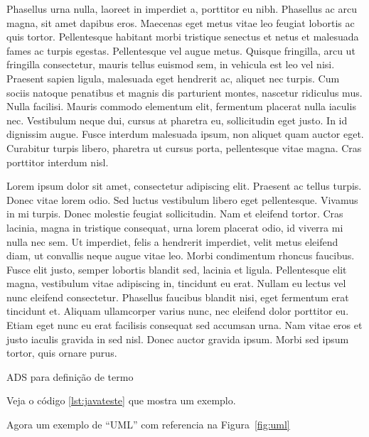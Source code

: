 \documentclass[tec, ads, scr, classic, a4paper,twoside]{ifbatcc}
\begin{document}
Phasellus urna nulla, laoreet in imperdiet a, porttitor eu nibh. Phasellus ac arcu magna, sit amet dapibus eros. Maecenas eget metus vitae leo feugiat lobortis ac quis tortor. Pellentesque habitant morbi tristique senectus et netus et malesuada fames ac turpis egestas. Pellentesque vel augue metus. Quisque fringilla, arcu ut fringilla consectetur, mauris tellus euismod sem, in vehicula est leo vel nisi. Praesent sapien ligula, malesuada eget hendrerit ac, aliquet nec turpis. Cum sociis natoque penatibus et magnis dis parturient montes, nascetur ridiculus mus. Nulla facilisi. Mauris commodo elementum elit, fermentum placerat nulla iaculis nec. Vestibulum neque dui, cursus at pharetra eu, sollicitudin eget justo. In id dignissim augue. Fusce interdum malesuada ipsum, non aliquet quam auctor eget. Curabitur turpis libero, pharetra ut cursus porta, pellentesque vitae magna. Cras porttitor interdum nisl.

Lorem ipsum dolor sit amet, consectetur adipiscing elit. Praesent ac tellus turpis. Donec vitae lorem odio. Sed luctus vestibulum libero eget pellentesque. Vivamus in mi turpis. Donec molestie feugiat sollicitudin. Nam et eleifend tortor. Cras lacinia, magna in tristique consequat, urna lorem placerat odio, id viverra mi nulla nec sem. Ut imperdiet, felis a hendrerit imperdiet, velit metus eleifend diam, ut convallis neque augue vitae leo. Morbi condimentum rhoncus faucibus. Fusce elit justo, semper lobortis blandit sed, lacinia et ligula. Pellentesque elit magna, vestibulum vitae adipiscing in, tincidunt eu erat. Nullam eu lectus vel nunc eleifend consectetur. Phasellus faucibus blandit nisi, eget fermentum erat tincidunt et. Aliquam ullamcorper varius nunc, nec eleifend dolor porttitor eu. Etiam eget nunc eu erat facilisis consequat sed accumsan urna. Nam vitae eros et justo iaculis gravida in sed nisl. Donec auctor gravida ipsum. Morbi sed ipsum tortor, quis ornare purus.

ADS  para definição de termo

Veja o código \ref{lst:javateste}  que mostra um exemplo.



Agora um exemplo de \enquote{UML} com referencia na Figura~\ref{fig:uml} 
\end{document}
